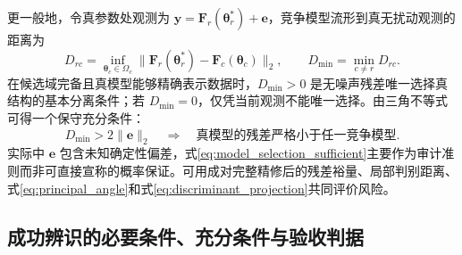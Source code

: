 \documentclass[UTF8,12pt,a4paper]{ctexart}
\begin{document}
更一般地，令真参数处观测为 $\bm y=\bm F_r(\bm\theta_r^*)+\bm e$，竞争模型流形到真无扰动观测的距离为
\begin{equation}
D_{rc}=\inf_{\bm\theta_c\in\Omega_c}
\|\bm F_r(\bm\theta_r^*)-\bm F_c(\bm\theta_c)\|_2,
\qquad
D_{\min}=\min_{c\ne r}D_{rc}.
\label{eq:model_manifold_distance}
\end{equation}
在候选域完备且真模型能够精确表示数据时，$D_{\min}>0$ 是无噪声残差唯一选择真结构的基本分离条件；若 $D_{\min}=0$，仅凭当前观测不能唯一选择。由三角不等式可得一个保守充分条件：
\begin{equation}
D_{\min}>2\|\bm e\|_2
\quad\Longrightarrow\quad
\text{真模型的残差严格小于任一竞争模型}.
\label{eq:model_selection_sufficient}
\end{equation}
实际中 $\bm e$ 包含未知确定性偏差，式\eqref{eq:model_selection_sufficient}主要作为审计准则而非可直接宣称的概率保证。可用成对完整精修后的残差裕量、局部判别距离、式\eqref{eq:principal_angle}和式\eqref{eq:discriminant_projection}共同评价风险。

\subsection{成功辨识的必要条件、充分条件与验收判据}
\end{document}
